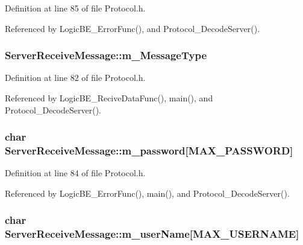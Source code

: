 Definition at line 85 of file Protocol.\+h.



Referenced by Logic\+B\+E\+\_\+\+Error\+Func(), and Protocol\+\_\+\+Decode\+Server().

\subsubsection[{\texorpdfstring{m\+\_\+\+Message\+Type}{m_MessageType}}]{ Server\+Receive\+Message\+::m\+\_\+\+Message\+Type}\hypertarget{structServerReceiveMessage_a00ebf9c3db5a28c62cb54ccfaffe1b27}{}\label{structServerReceiveMessage_a00ebf9c3db5a28c62cb54ccfaffe1b27}


Definition at line 82 of file Protocol.\+h.



Referenced by Logic\+B\+E\+\_\+\+Recive\+Data\+Func(), main(), and Protocol\+\_\+\+Decode\+Server().

\subsubsection[{\texorpdfstring{m\+\_\+password}{m_password}}]{\setlength{\rightskip}{0pt plus 5cm}char Server\+Receive\+Message\+::m\+\_\+password\mbox{[}{\bf M\+A\+X\+\_\+\+P\+A\+S\+S\+W\+O\+RD}\mbox{]}}\hypertarget{structServerReceiveMessage_a6def7f46d5d3f51d29b4e819fe624e35}{}\label{structServerReceiveMessage_a6def7f46d5d3f51d29b4e819fe624e35}


Definition at line 84 of file Protocol.\+h.



Referenced by Logic\+B\+E\+\_\+\+Error\+Func(), main(), and Protocol\+\_\+\+Decode\+Server().

\subsubsection[{\texorpdfstring{m\+\_\+user\+Name}{m_userName}}]{\setlength{\rightskip}{0pt plus 5cm}char Server\+Receive\+Message\+::m\+\_\+user\+Name\mbox{[}{\bf M\+A\+X\+\_\+\+U\+S\+E\+R\+N\+A\+ME}\mbox{]}}\hypertarget{structServerReceiveMessage_abadd97dfb24d6ced8419f6737b3155c2}{}\label{structServerReceiveMessage_abadd97dfb24d6ced8419f6737b3155c2}


